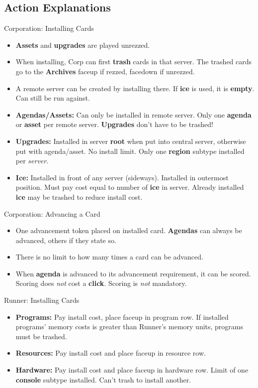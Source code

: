 \documentclass[12pt]{article}
\newenvironment{itemizeCustom}
{\begin{itemize}
  \setlength{\itemsep}{1pt}
  \setlength{\parskip}{0pt}
  \setlength{\parsep}{0pt}}
{\end{itemize}}
\begin{document}
\begin{multicols*}{2}
\section*{Action Explanations}
Corporation: Installing Cards
\begin{itemizeCustom}
	\item \textbf{Assets} and \textbf{upgrades} are played unrezzed. 
	\item When installing, Corp can first \textbf{trash} cards in that server. The trashed cards go to the \textbf{Archives} faceup if rezzed, facedown if unrezzed.
	\item A remote server can be created by installing there. If \textbf{ice} is used, it is \textbf{empty}. Can still be run against.
	\item \textbf{Agendas/Assets:} Can only be installed in remote server. Only one \textbf{agenda} or \textbf{asset} per remote server. \textbf{Upgrades} don't have to be trashed!
	\item \textbf{Upgrades:} Installed in server \textbf{root} when put into central server, otherwise put with agenda/asset. No install limit. Only one \textbf{region} subtype installed per \emph{server}.
	\item \textbf{Ice:} Installed in front of any server (sideways). Installed in outermost position. Must pay cost equal to number of \textbf{ice} in server. Already installed \textbf{ice} may be trashed to reduce install cost.
\end{itemizeCustom}

Corporation: Advancing a Card
\begin{itemizeCustom}
	\item One advancement token placed on installed card. \textbf{Agendas} can always be advanced, others if they state so.
	\item There is no limit to how many times a card can be advanced. 
	\item When \textbf{agenda} is advanced to its advancement requirement, it can be scored. Scoring does \emph{not} cost a \textbf{click}. Scoring is \emph{not} mandatory.
\end{itemizeCustom}

Runner: Installing Cards
\begin{itemizeCustom}
	\item \textbf{Programs:} Pay install cost, place faceup in program row. If installed programs' memory costs is greater than Runner's memory units, programs must be trashed.
	\item \textbf{Resources:} Pay install cost and place faceup in resource row.
	\item \textbf{Hardware:} Pay install cost and place faceup in hardware row. Limit of one \textbf{console} subtype installed. Can't trash to install another.
\end{itemizeCustom}


\end{multicols*}
\end{document}
